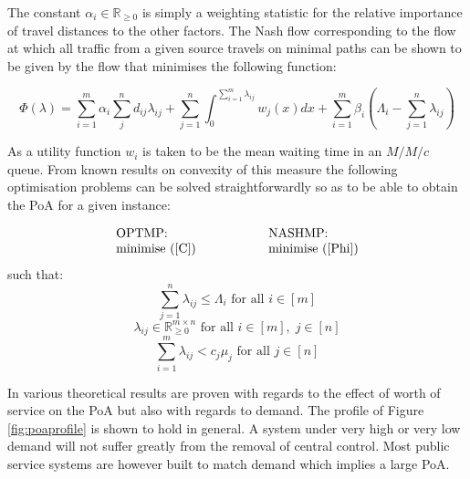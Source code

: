 \documentclass[a4paper,11pt]{article}
\begin{document}
The constant $\alpha_i\in\mathbb{R}_{\geq0}$ is simply a weighting statistic for the relative importance of travel distances to the other factors.
The Nash flow corresponding to the flow at which all traffic from a given source travels on minimal paths can be shown to be given by the flow that minimises the following function:

\begin{equation}
\Phi(\lambda)=\sum_{i=1}^m\alpha_i\sum_{j}^nd_{ij}\lambda_{ij}+\sum_{j=1}^n\int_0^{\sum_{i=1}^m\lambda_{ij}}w_j(x)dx+\sum_{i=1}^m\beta_i\left(\Lambda_i-\sum_{j=1}^n\lambda_{ij}\right)
\label{Phi}\end{equation}

As a utility function $w_i$ is taken to be the mean waiting time in an $M/M/c$ queue.
From known results on convexity of this measure \cite{lee_note_1983} the following optimisation problems can be solved straightforwardly so as to be able to obtain the PoA for a given instance:

$$\begin{array}{l@{\hspace{2cm}}l}\text{OPTMP:}&\text{NASHMP:}\\
\text{minimise }(\ref{C})&\text{minimise }(\ref{Phi})
\end{array}$$
such that:
\begin{equation}
\sum_{j=1}^n\lambda_{ij}\leq\Lambda_{i}\text{ for all }i\in[m]\label{constraint 1}
\end{equation}
\begin{equation}
\lambda_{ij}\in\mathbb{R}^{m\times n}_{\geq 0}\text{ for all }i\in[m],\;j\in[n]\label{constraint 2}
\end{equation}
\begin{equation}
\sum_{i=1}^m\lambda_{ij}<c_j\mu_j\text{ for all }j\in[n]\label{constraint 3}
\end{equation}

In \cite{Knight2013} various theoretical results are proven with regards to the effect of worth of service on the PoA but also with regards to demand.
The profile of Figure \ref{fig:poaprofile} is shown to hold in general.
A system under very high or very low demand will not suffer greatly from the removal of central control.
Most public service systems are however built to match demand which implies a large PoA.
\end{document}
